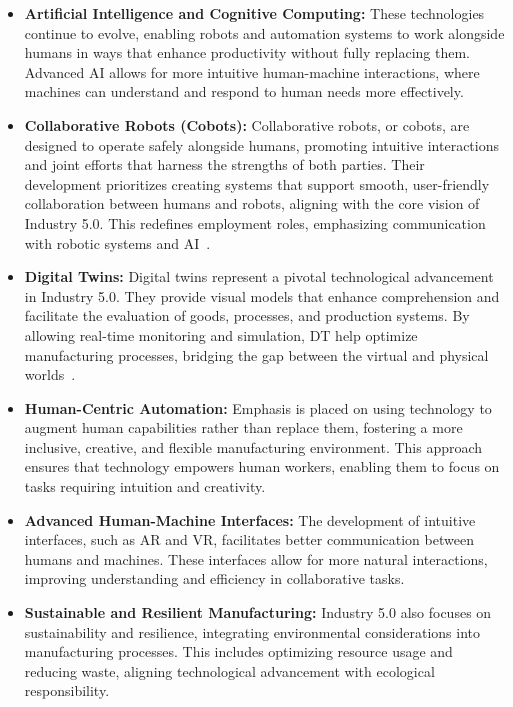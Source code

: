 \begin{itemize}
    \item \textbf{Artificial Intelligence and Cognitive Computing:} These technologies continue to evolve, enabling robots and automation systems to work alongside humans in ways that enhance productivity without fully replacing them. Advanced \ac{AI} allows for more intuitive human-machine interactions, where machines can understand and respond to human needs more effectively.

    \item \textbf{Collaborative Robots (Cobots):} Collaborative robots, or cobots, are designed to operate safely alongside humans, promoting intuitive interactions and joint efforts that harness the strengths of both parties. Their development prioritizes creating systems that support smooth, user-friendly collaboration between humans and robots, aligning with the core vision of Industry 5.0. This redefines employment roles, emphasizing communication with robotic systems and \ac{AI}~\cite{10577684}.

    \item \textbf{Digital Twins:} Digital twins represent a pivotal technological advancement in Industry 5.0. They provide visual models that enhance comprehension and facilitate the evaluation of goods, processes, and production systems. By allowing real-time monitoring and simulation, \ac{DT} help optimize manufacturing processes, bridging the gap between the virtual and physical worlds~\cite{10577684}.

    \item \textbf{Human-Centric Automation:} Emphasis is placed on using technology to augment human capabilities rather than replace them, fostering a more inclusive, creative, and flexible manufacturing environment. This approach ensures that technology empowers human workers, enabling them to focus on tasks requiring intuition and creativity.

    \item \textbf{Advanced Human-Machine Interfaces:} The development of intuitive interfaces, such as \ac{AR} and \ac{VR}, facilitates better communication between humans and machines. These interfaces allow for more natural interactions, improving understanding and efficiency in collaborative tasks.

    \item \textbf{Sustainable and Resilient Manufacturing:} Industry 5.0 also focuses on sustainability and resilience, integrating environmental considerations into manufacturing processes. This includes optimizing resource usage and reducing waste, aligning technological advancement with ecological responsibility.
\end{itemize}

